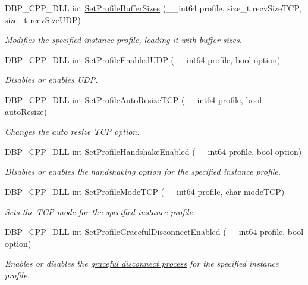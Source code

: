 \begin{DoxyCompactItemize}
DBP\_\-CPP\_\-DLL int \hyperlink{namespacemn_aa0e91e83b9cc8642ff935854764820c2}{SetProfileBufferSizes} (\_\-\_\-int64 profile, size\_\-t recvSizeTCP, size\_\-t recvSizeUDP)
\begin{DoxyCompactList}\small\item\em Modifies the specified instance profile, loading it with buffer sizes. \item\end{DoxyCompactList}\item 
DBP\_\-CPP\_\-DLL int \hyperlink{namespacemn_ad2fa263955d14ec167e70a857af2aaab}{SetProfileEnabledUDP} (\_\-\_\-int64 profile, bool option)
\begin{DoxyCompactList}\small\item\em Disables or enables UDP. \item\end{DoxyCompactList}\item 
DBP\_\-CPP\_\-DLL int \hyperlink{namespacemn_ab410089cf457da4cb7ba8e56b8c8b013}{SetProfileAutoResizeTCP} (\_\-\_\-int64 profile, bool autoResize)
\begin{DoxyCompactList}\small\item\em Changes the auto resize TCP option. \item\end{DoxyCompactList}\item 
DBP\_\-CPP\_\-DLL int \hyperlink{namespacemn_a0599cc2661f22695799eb75861133737}{SetProfileHandshakeEnabled} (\_\-\_\-int64 profile, bool option)
\begin{DoxyCompactList}\small\item\em Disables or enables the handshaking option for the specified instance profile. \item\end{DoxyCompactList}\item 
DBP\_\-CPP\_\-DLL int \hyperlink{namespacemn_a6eef27da5b215a832d533e3f23ec17b2}{SetProfileModeTCP} (\_\-\_\-int64 profile, char modeTCP)
\begin{DoxyCompactList}\small\item\em Sets the TCP mode for the specified instance profile. \item\end{DoxyCompactList}\item 
DBP\_\-CPP\_\-DLL int \hyperlink{namespacemn_abfa7ac2dada8b706375f283e6ca7d9c8}{SetProfileGracefulDisconnectEnabled} (\_\-\_\-int64 profile, bool option)
\begin{DoxyCompactList}\small\item\em Enables or disables the \hyperlink{graceful_disconnect_page}{graceful disconnect process} for the specified instance profile. \item\end{DoxyCompactList}\item 

\end{DoxyCompactItemize}
